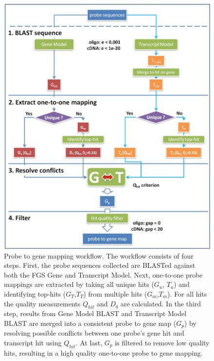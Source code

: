 \begin{figure}
	\centering
	\medskip
  	\includegraphics[width=1\textwidth]{ApdxB-workflow.jpg}
  	\caption[Probe to gene mapping workflow]
  	{Probe to gene mapping workflow. The workflow consists of four
  	steps. First, the probe sequences collected are BLASTed against
  	both the FGS Gene and Transcript Model. Next, one-to-one probe
  	mappings are extracted by taking all unique hits ($G_u$, $T_u$) and
  	identifying top-hits ($G_T$,$T_T$) from multiple hits ($G_m$,$T_m$). For all
  	hits the quality measurements $Q_{hit}$ and $D_q$ are calculated. In the
  	third step, results from Gene Model BLAST and Transcript Model
  	BLAST are merged into a consistent probe to gene map ($G_p$) by
  	resolving possible conflicts between one probe’s gene hit and
  	transcript hit using $Q_{hit}$. At last, $G_p$ is filtered to remove low
  	quality hits, resulting in a high quality one-to-one probe to
  	gene mapping.}
  	\label{fig:magic-pmap}
\end{figure}


